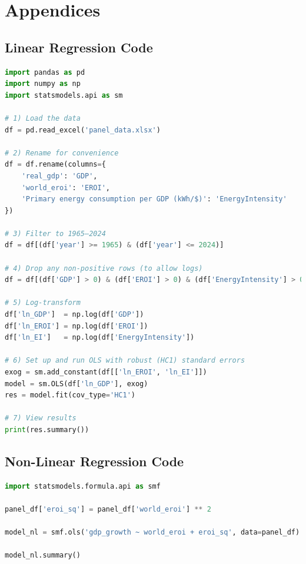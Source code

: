 \documentclass[a4paper,12pt]{article}
\begin{document}
\section{Appendices}

\subsection{Linear Regression Code}
\begin{lstlisting}[language=Python, caption={Non-Linear Regression}, label={lst:eroi_code}]
import pandas as pd
import numpy as np
import statsmodels.api as sm

# 1) Load the data
df = pd.read_excel('panel_data.xlsx')

# 2) Rename for convenience
df = df.rename(columns={
    'real_gdp': 'GDP',
    'world_eroi': 'EROI',
    'Primary energy consumption per GDP (kWh/$)': 'EnergyIntensity'
})

# 3) Filter to 1965–2024
df = df[(df['year'] >= 1965) & (df['year'] <= 2024)]

# 4) Drop any non-positive rows (to allow logs)
df = df[(df['GDP'] > 0) & (df['EROI'] > 0) & (df['EnergyIntensity'] > 0)]

# 5) Log‐transform
df['ln_GDP']  = np.log(df['GDP'])
df['ln_EROI'] = np.log(df['EROI'])
df['ln_EI']   = np.log(df['EnergyIntensity'])

# 6) Set up and run OLS with robust (HC1) standard errors
exog = sm.add_constant(df[['ln_EROI', 'ln_EI']])
model = sm.OLS(df['ln_GDP'], exog)
res = model.fit(cov_type='HC1')

# 7) View results
print(res.summary())\end{lstlisting}

\subsection{Non-Linear Regression Code}
\begin{lstlisting}[language=Python, caption={Non-Linear Regression}, label={lst:eroi_code}]
import statsmodels.formula.api as smf

panel_df['eroi_sq'] = panel_df['world_eroi'] ** 2

model_nl = smf.ols('gdp_growth ~ world_eroi + eroi_sq', data=panel_df).fit()

model_nl.summary()
\end{lstlisting}
\end{document}
